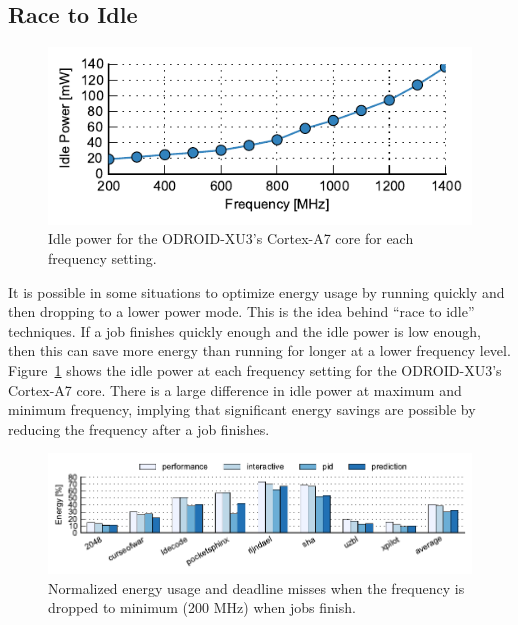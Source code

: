 \subsection{Race to Idle}

\begin{figure}
  \begin{center}
    \includegraphics{exec_time_prediction/data/idle_power.pdf}
    \caption{Idle power for the ODROID-XU3's Cortex-A7 core for each frequency
    setting.}
    \label{fig:exec_time_prediction.evaluation.idle_power}
  \end{center}
\end{figure}

It is possible in some situations to optimize energy usage by running quickly
and then dropping to a lower power mode. This is the idea behind ``race to
idle'' techniques.  If a job finishes quickly enough and the idle power is low
enough, then this can save more energy than running for longer at a lower
frequency level.  Figure~\ref{fig:exec_time_prediction.evaluation.idle_power}
shows the idle power at each frequency setting for the ODROID-XU3's Cortex-A7
core.  There is a large difference in idle power at maximum and minimum
frequency, implying that significant energy savings are possible by reducing
the frequency after a job finishes.

\begin{figure}
  \begin{center}
    \includegraphics{exec_time_prediction/data/em_summary_idle.pdf}
    \caption{Normalized energy usage and deadline misses when the frequency is
    dropped to minimum (200 MHz) when jobs finish.}
    \label{fig:exec_time_prediction.evaluation.em_summary_idle}
  \end{center}
\end{figure}

